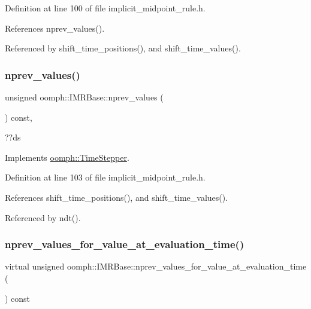 Definition at line 100 of file implicit\+\_\+midpoint\+\_\+rule.\+h.



References nprev\+\_\+values().



Referenced by shift\+\_\+time\+\_\+positions(), and shift\+\_\+time\+\_\+values().

\mbox{\label{classoomph_1_1IMRBase_a973faf88d44644bde495ffd6b9acbef1}} 
\subsubsection{\texorpdfstring{nprev\+\_\+values()}{nprev\_values()}}
{\footnotesize\ttfamily unsigned oomph\+::\+I\+M\+R\+Base\+::nprev\+\_\+values (\begin{DoxyParamCaption}{ }\end{DoxyParamCaption}) const\hspace{0.3cm}{\ttfamily [inline]}, {\ttfamily [virtual]}}



??ds 



Implements \hyperlink{classoomph_1_1TimeStepper_a0f38713ed304c18d9f7b5cf8131664c1}{oomph\+::\+Time\+Stepper}.



Definition at line 103 of file implicit\+\_\+midpoint\+\_\+rule.\+h.



References shift\+\_\+time\+\_\+positions(), and shift\+\_\+time\+\_\+values().



Referenced by ndt().

\mbox{\label{classoomph_1_1IMRBase_a93df756c834f8ba27956b8efb2af3636}} 
\subsubsection{\texorpdfstring{nprev\+\_\+values\+\_\+for\+\_\+value\+\_\+at\+\_\+evaluation\+\_\+time()}{nprev\_values\_for\_value\_at\_evaluation\_time()}}
{\footnotesize\ttfamily virtual unsigned oomph\+::\+I\+M\+R\+Base\+::nprev\+\_\+values\+\_\+for\+\_\+value\+\_\+at\+\_\+evaluation\+\_\+time (\begin{DoxyParamCaption}{ }\end{DoxyParamCaption}) const\hspace{0.3cm}{\ttfamily [pure virtual]}}

